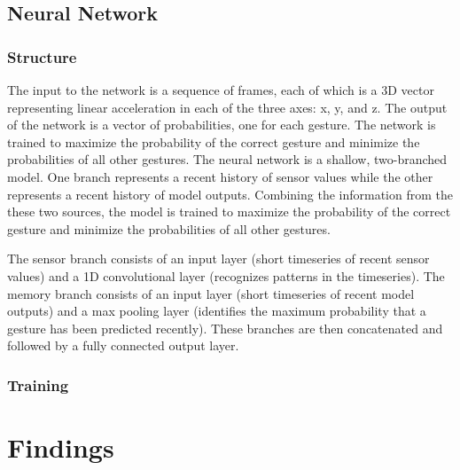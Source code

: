 \documentclass{article}
\begin{document}
\subsection{Neural Network}
\subsubsection{Structure}

The input to the network is a sequence of frames, each of which is a 3D vector representing linear acceleration in each of the three axes: x, y, and z. The output of the network is a vector of probabilities, one for each gesture. The network is trained to maximize the probability of the correct gesture and minimize the probabilities of all other gestures.
The neural network is a shallow, two-branched model. One branch represents a recent history of sensor values while the other represents a recent history of model outputs. Combining the information from the these two sources, the model is trained to maximize the probability of the correct gesture and minimize the probabilities of all other gestures.

The sensor branch consists of an input layer (short timeseries of recent sensor values) and a 1D convolutional layer (recognizes patterns in the timeseries). The memory branch consists of an input layer (short timeseries of recent model outputs) and a max pooling layer (identifies the maximum probability that a gesture has been predicted recently). These branches are then concatenated and followed by a fully connected output layer.

\subsubsection{Training}







\section{Findings}



\end{document}
